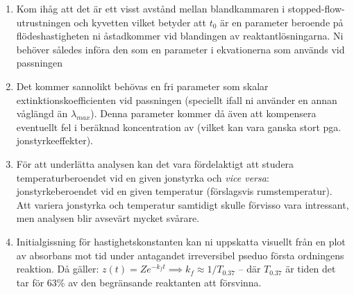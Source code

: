 \begin{enumerate}
\item Kom ihåg att det är ett visst
  avstånd mellan blandkammaren i stopped-flow-utrustningen och
  kyvetten vilket betyder att $t_0$ är en parameter beroende på
  flödeshastigheten ni åstadkommer vid blandingen av
  reaktantlösningarna. Ni behöver således införa den som en parameter i
  ekvationerna som används vid passningen
\item Det kommer sannolikt behövas en fri parameter som skalar
  extinktionskoefficienten vid passningen (speciellt ifall ni använder en
  annan våglängd än $\lambda_{max}$). Denna parameter kommer då även att
  kompensera eventuellt fel i beräknad koncentration av 
  (vilket kan vara ganska stort pga. jonstyrkeeffekter).
\item För att underlätta analysen kan det vara fördelaktigt att studera
  temperaturberoendet vid en given jonstyrka och {\em vice versa}:
  jonstyrkeberoendet vid en given temperatur (förslagsvis
  rumstemperatur). Att variera jonstyrka och temperatur samtidigt skulle
  förvisso vara intressant, men analysen blir avsevärt mycket svårare.
\item Initialgissning för hastighetskonstanten kan ni uppskatta visuellt
  från en plot av absorbans mot tid under antagandet irreversibel pseduo
  första ordningens reaktion. Då gäller: $z(t) = Ze^{-k_f t} \implies k_f
  \approx 1/T_{0.37}$ -- där $T_{0.37}$ är tiden det tar för 63\% av den
  begränsande reaktanten att försvinna.



\end{enumerate}

